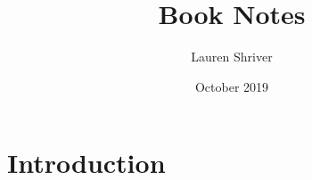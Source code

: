 \documentclass{article}
\title{Book Notes}
\author{Lauren Shriver}
\date{October 2019}
\begin{document}
\maketitle

\section{Introduction}
\end{document}
